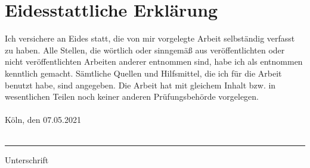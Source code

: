 \section*{Eidesstattliche Erklärung}
Ich versichere an Eides statt, die von mir vorgelegte Arbeit selbständig verfasst zu haben. Alle Stellen, die wörtlich oder sinngemä{\ss} aus veröffentlichten oder nicht veröffentlichten Arbeiten anderer entnommen sind, habe ich als entnommen kenntlich gemacht. Sämtliche Quellen und Hilfsmittel, die ich für die Arbeit benutzt habe, sind angegeben. Die Arbeit hat mit gleichem Inhalt bzw. in wesentlichen Teilen noch keiner anderen Prüfungsbehörde vorgelegen.
~\\
~\\
Köln, den 07.05.2021
~\\
~\\
\rule{0.35\textwidth}{0.4pt}\newline
Unterschrift
\newpage
